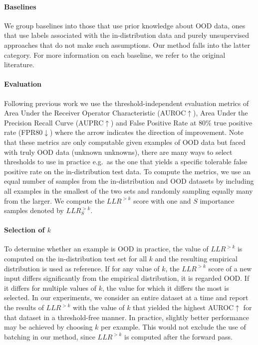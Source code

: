 {%
\paragraph{Baselines} We group baselines into those that use prior knowledge about OOD data, ones that use labels associated with the in-distribution data and purely unsupervised approaches that do not make such assumptions.
Our method falls into the latter category.
For more information on each baseline, we refer to the original literature.


\paragraph{Evaluation} Following previous work \cite{hendrycks_baseline_2017, hendrycks_deep_2019, alemi_uncertainty_2018, ren_likelihood_2019, choi_waic_2019} we use the threshold-independent evaluation metrics of Area Under the Receiver Operator Characteristic (AUROC$\uparrow$), Area Under the Precision Recall Curve (AUPRC$\uparrow$) and False Positive Rate at 80\% true positive rate (FPR80$\downarrow$) where the arrow indicates the direction of improvement.
Note that these metrics are only computable given examples of OOD data but faced with truly OOD data (unknown unknowns), there are many ways to select thresholds to use in practice e.g.\ as the one that yields a specific tolerable false positive rate on the in-distribution test data.
To compute the metrics, we use an equal number of samples from the in-distribution and OOD datasets by including all examples in the smallest of the two sets and randomly sampling equally many from the larger. We compute the $LLR^{>k}$ score with one and $S$ importance samples denoted by $LLR^{>k}_S$.

\paragraph{Selection of $k$} To determine whether an example is OOD in practice, the value of $LLR^{>k}$ is computed on the in-distribution test set for all $k$ and the resulting empirical distribution is used as reference.
If for any value of $k$, the $LLR^{>k}$ score of a new input differs significantly from the empirical distribution, it is regarded OOD.
If it differs for multiple values of $k$, the value for which it differs the most is selected.
In our experiments, we consider an entire dataset at a time and report the results of $LLR^{>k}$ with the value of $k$ that yielded the highest AUROC$\uparrow$ for that dataset in a threshold-free manner.
In practice, slightly better performance may be achieved by choosing $k$ per example.
This would not exclude the use of batching in our method, since $LLR^{>k}$ is computed after the forward pass.


}
